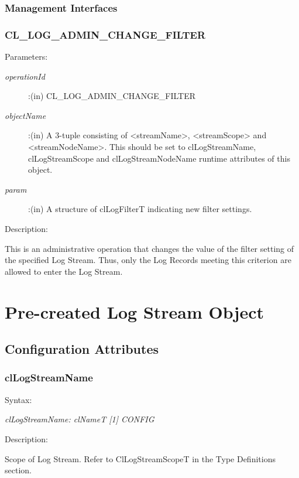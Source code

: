 \begin{flushleft}
\subsubsection{Management Interfaces}

\subsubsection{CL\_\-LOG\_\-ADMIN\_\-CHANGE\_\-FILTER}
\begin{Desc}
\item[Parameters:] 
\begin{description}
\item[{\em operationId}]:(in) CL\_\-LOG\_\-ADMIN\_\-CHANGE\_\-FILTER
\item[{\em objectName}]:(in) A 3-tuple consisting of <streamName>, <streamScope> and <streamNodeName>. This should be set to clLogStreamName, 
clLogStreamScope and clLogStreamNodeName runtime attributes of this object.
\item[{\em param}]:(in) A structure of clLogFilterT indicating new filter settings.
\end{description}
\end{Desc}
\begin{Desc}
 \item[Description:]
\end{Desc}
This is an administrative operation that changes the value of the filter setting of the specified Log Stream. Thus, only the Log Records 
meeting this criterion are allowed to enter the Log Stream.




\section{Pre-created Log Stream Object}
\subsection{Configuration Attributes}


\subsubsection{clLogStreamName}
\begin{Desc}
\item[Syntax:]
\end{Desc}
\textit{clLogStreamName: clNameT [1] {CONFIG}}
\begin{Desc}
 \item[Description:]
\end{Desc}
Scope of Log Stream. Refer to ClLogStreamScopeT in the Type Definitions section.



\end{flushleft}
